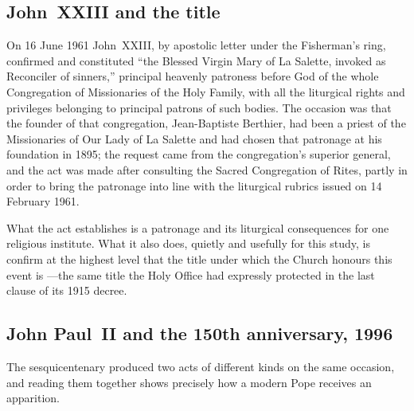 \subsection{John~XXIII and the title }

On 16 June 1961 John~XXIII, by apostolic letter under the Fisherman's
ring, confirmed and constituted ``the Blessed Virgin Mary of La
Salette, invoked as Reconciler of sinners,'' principal heavenly
patroness before God of the whole Congregation of Missionaries of
the Holy Family, with all the liturgical rights and privileges
belonging to principal patrons of such bodies. The occasion was that
the founder of that congregation, Jean-Baptiste Berthier, had been a
priest of the Missionaries of Our Lady of La Salette and had chosen
that patronage at his foundation in 1895; the request came from the
congregation's superior general, and the act was made after
consulting the Sacred Congregation of Rites, partly in order to
bring the patronage into line with the liturgical rubrics issued on
14 February 1961.

What the act establishes is a patronage and its liturgical
consequences for one religious institute. What it also does, quietly
and usefully for this study, is confirm at the highest level that
the title under which the Church honours this event is
---the same title the Holy Office had
expressly protected in the last clause of its 1915 decree.

\subsection{John Paul~II and the 150th anniversary, 1996}

The sesquicentenary produced two acts of different kinds on the same
occasion, and reading them together shows precisely how a modern Pope
receives an apparition.

